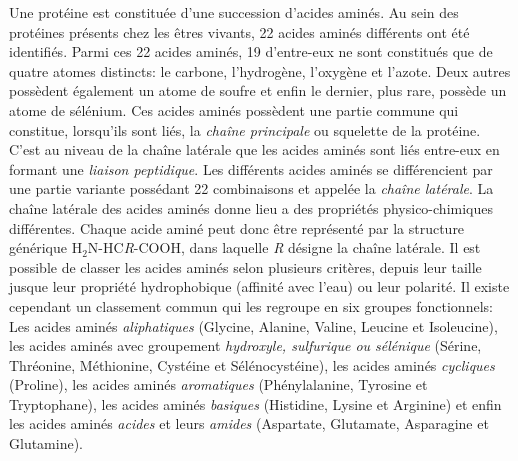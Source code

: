 Une protéine est constituée d'une succession d'acides aminés. Au sein des protéines présents chez les êtres vivants, 22 acides aminés différents ont été identifiés. Parmi ces 22 acides aminés, 19 d'entre-eux ne sont constitués que de quatre atomes distincts: le carbone, l'hydrogène, l'oxygène et l'azote. Deux autres possèdent également un atome de soufre et enfin le dernier, plus rare, possède un atome de sélénium. Ces acides aminés possèdent une partie commune qui constitue, lorsqu'ils sont liés, la \textit{chaîne principale} ou squelette de la protéine. C'est au niveau de la chaîne latérale que les acides aminés sont liés entre-eux en formant une \textit{liaison peptidique}. Les différents acides aminés se différencient par une partie variante possédant 22 combinaisons et appelée la \textit{chaîne latérale}. La chaîne latérale des acides aminés donne lieu a des propriétés physico-chimiques différentes. Chaque acide aminé peut donc être représenté par la structure générique H$_{2}$N-HC\textit{R}-COOH, dans laquelle \textit{R} désigne la chaîne latérale. 
Il est possible de classer les acides aminés selon plusieurs critères, depuis leur taille jusque leur propriété hydrophobique (affinité avec l'eau) ou leur polarité. Il existe cependant un classement commun qui les regroupe en six groupes fonctionnels: Les acides aminés \textit{aliphatiques} (Glycine, Alanine, Valine, Leucine et Isoleucine), les acides aminés avec groupement \textit{hydroxyle, sulfurique ou sélénique} (Sérine, Thréonine, Méthionine, Cystéine et Sélénocystéine), les acides aminés \textit{cycliques} (Proline), les acides aminés \textit{aromatiques} (Phénylalanine, Tyrosine et Tryptophane), les acides aminés \textit{basiques} (Histidine, Lysine et Arginine) et enfin les acides aminés \textit{acides} et leurs \textit{amides} (Aspartate, Glutamate, Asparagine et Glutamine).

